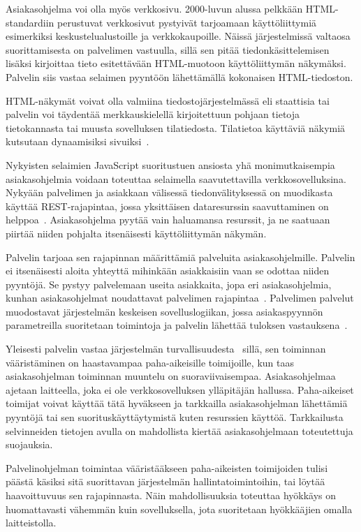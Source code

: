 \documentclass[finnish]{tktltiki2}%
\theoremstyle{definition}
\theoremstyle{remark}
\begin{document}
Asiakasohjelma voi olla myös verkkosivu. 2000-luvun alussa
pelkkään HTML-standardiin perustuvat verkkosivut pystyivät
tarjoamaan käyttöliittymiä esimerkiksi keskustelualustoille ja verkkokaupoille.
Näissä järjestelmissä valtaosa suorittamisesta on palvelimen vastuulla,
sillä sen pitää tiedonkäsittelemisen lisäksi kirjoittaa tieto
esitettävään HTML-muotoon käyttöliittymän näkymäksi. Palvelin
siis vastaa selaimen pyyntöön lähettämällä kokonaisen HTML-tiedoston.

HTML-näkymät voivat olla valmiina tiedostojärjestelmässä eli staattisia tai
palvelin voi täydentää merkkauskielellä kirjoitettuun pohjaan
tietoja tietokannasta tai muusta sovelluksen tilatiedosta. 
Tilatietoa käyttäviä näkymiä kutsutaan dynaamisiksi sivuiksi~\cite{pai_flash_1999}.

Nykyisten selaimien JavaScript suoritustuen ansiosta yhä
monimutkaisempia asiakasohjelmia voidaan toteuttaa
selaimella saavutettavilla verkkosovelluksina.
Nykyään palvelimen ja asiakkaan
välisessä tiedonvälityksessä on muodikasta käyttää REST-rajapintaa, jossa
yksittäisen dataresurssin saavuttaminen on helppoa~\cite{battle_bridging_2008}.
Asiakasohjelma pyytää vain haluamansa resurssit, ja ne saatuaan piirtää
niiden pohjalta
itsenäisesti käyttöliittymän näkymän.

Palvelin tarjoaa sen rajapinnan määrittämiä palveluita asiakasohjelmille.
Palvelin ei itsenäisesti aloita yhteyttä mihinkään
asiakkaisiin vaan se odottaa niiden pyyntöjä.
Se pystyy palvelemaan useita asiakkaita, jopa
eri asiakasohjelmia, kunhan asiakasohjelmat noudattavat
palvelimen rajapintaa~\cite{sinha_client-server_1992}.
Palvelimen palvelut muodostavat järjestelmän keskeisen
sovelluslogiikan, jossa asiakaspyynnön parametreilla
suoritetaan toimintoja ja palvelin lähettää
tuloksen vastauksena~\cite{sinha_client-server_1992}.

Yleisesti palvelin vastaa järjestelmän turvallisuudesta~\cite{sinha_client-server_1992} sillä,
sen toiminnan vääristäminen on haastavampaa paha-aikeisille
toimijoille, kun taas asiakasohjelman toiminnan muuntelu on suoraviivaisempaa.
Asiakasohjelmaa ajetaan laitteella, joka ei ole verkkosovelluksen
ylläpitäjän hallussa. Paha-aikeiset toimijat voivat käyttää tätä hyväkseen
ja tarkkailla asiakasohjelman lähettämiä pyyntöjä tai sen
suorituskäyttäytymistä kuten resurssien käyttöä.
Tarkkailusta selvinneiden tietojen avulla on mahdollista
kiertää asiakasohjelmaan toteutettuja suojauksia.

Palvelinohjelman toimintaa vääristääkseen
paha-aikeisten toimijoiden tulisi päästä
käsiksi sitä suorittavan järjestelmän hallintatoimintoihin, tai
löytää haavoittuvuus sen rajapinnasta. Näin mahdollisuuksia
toteuttaa hyökkäys on huomattavasti vähemmän kuin sovelluksella, jota
suoritetaan hyökkääjien omalla laitteistolla.
\end{document}
